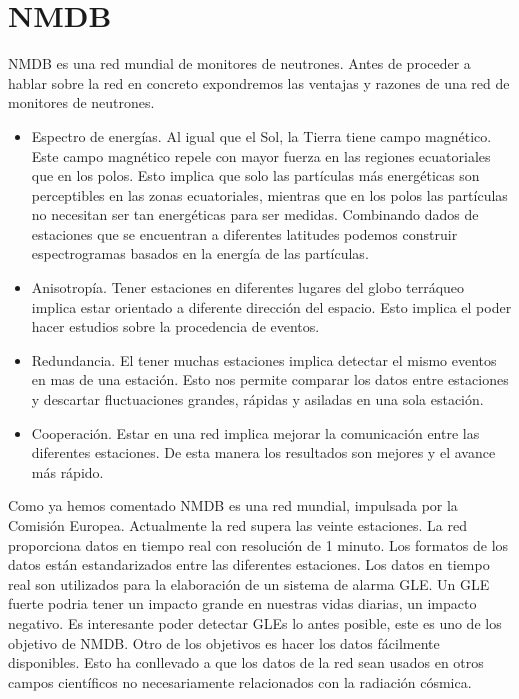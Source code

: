 \section{NMDB}
	NMDB es una red mundial de monitores de neutrones. Antes de proceder a hablar sobre la red en concreto expondremos las ventajas y razones de
	una red de monitores de neutrones.
	\begin{itemize}
		\item 	Espectro de energías. Al igual que el Sol, la Tierra tiene campo magnético. Este campo magnético repele con mayor fuerza en
		  	las regiones ecuatoriales que en los polos. Esto implica que solo las partículas más energéticas son perceptibles en las
			zonas ecuatoriales, mientras que en los polos las partículas no necesitan ser tan energéticas para ser medidas. Combinando
			dados de estaciones que se encuentran a diferentes latitudes podemos construir espectrogramas basados en la energía de las
			partículas.
		\item 	Anisotropía. Tener estaciones en diferentes lugares del globo terráqueo implica estar orientado a diferente dirección del
		  	espacio. Esto implica el poder hacer estudios sobre la procedencia de eventos.
		\item 	Redundancia. El tener muchas estaciones implica detectar el mismo eventos en mas de una estación. Esto nos permite comparar
		  	los datos entre estaciones y descartar fluctuaciones grandes, rápidas y asiladas en una sola estación.
		\item 	Cooperación. Estar en una red implica mejorar la comunicación entre las diferentes estaciones. De esta manera los resultados
		  	son mejores y el avance más rápido. 
	\end{itemize}
	Como ya hemos comentado NMDB es una red mundial, impulsada por la Comisión Europea. Actualmente la red supera las veinte estaciones. La red 
	proporciona datos en tiempo real con resolución de 1 minuto. Los formatos de los datos están estandarizados entre las diferentes estaciones.
	Los datos en tiempo real son utilizados para la elaboración de un sistema de alarma GLE. Un GLE fuerte podria tener un impacto grande en
	nuestras vidas diarias, un impacto negativo. Es interesante poder detectar GLEs lo antes posible, este es uno de los objetivo de NMDB.
	Otro de los objetivos es hacer los datos fácilmente disponibles. Esto ha conllevado a que los datos de la red sean usados en otros campos 
	científicos no necesariamente relacionados con la radiación cósmica. 



